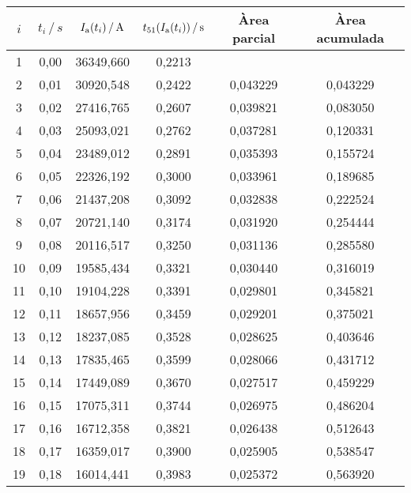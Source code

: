 \begin{exemple}
 	
    \begin{center}
    	\centering
    	\begin{tabular}{S[table-format=2.0]S[table-format=1.2]
    	                S[table-format=5.3]S[table-format=1.4]
    	            	S[table-format=1.6]S[table-format=1.6]}
    	  &  {$t_i\,/\,\unit{s}$}  &  {$I\ped{a}(t_i)\,/\,\unit{A}$}  & {$t_{51}(I\ped{a}(t_i))\,/\,\unit{s}$}  & {Àrea parcial}  & {Àrea acumulada} \\
    	  &  0,00  &  36349,660  &  0,2213  &  {}        &  {}       \\
         2  &  0,01  &  30920,548  &  0,2422  &  0,043229  &  0,043229 \\
    	 3  &  0,02  &  27416,765  &  0,2607  &  0,039821  &  0,083050 \\
    	 4  &  0,03  &  25093,021  &  0,2762  &  0,037281  &  0,120331 \\
    	 5  &  0,04  &  23489,012  &  0,2891  &  0,035393  &  0,155724 \\
    	 6  &  0,05  &  22326,192  &  0,3000  &  0,033961  &  0,189685 \\
    	 7  &  0,06  &  21437,208  &  0,3092  &  0,032838  &  0,222524 \\
    	 8  &  0,07  &  20721,140  &  0,3174  &  0,031920  &  0,254444 \\
    	 9  &  0,08  &  20116,517  &  0,3250  &  0,031136  &  0,285580 \\
    	10  &  0,09  &  19585,434  &  0,3321  &  0,030440  &  0,316019 \\
    	11  &  0,10  &  19104,228  &  0,3391  &  0,029801  &  0,345821 \\
    	12  &  0,11  &  18657,956  &  0,3459  &  0,029201  &  0,375021 \\
    	13  &  0,12  &  18237,085  &  0,3528  &  0,028625  &  0,403646 \\
    	14  &  0,13  &  17835,465  &  0,3599  &  0,028066  &  0,431712 \\
    	15  &  0,14  &  17449,089  &  0,3670  &  0,027517  &  0,459229 \\
    	16  &  0,15  &  17075,311  &  0,3744  &  0,026975  &  0,486204 \\
    	17  &  0,16  &  16712,358  &  0,3821  &  0,026438  &  0,512643 \\
    	18  &  0,17  &  16359,017  &  0,3900  &  0,025905  &  0,538547 \\
    	19  &  0,18  &  16014,441  &  0,3983  &  0,025372  &  0,563920 \\

\end{tabular}
\end{center}
\end{exemple}
